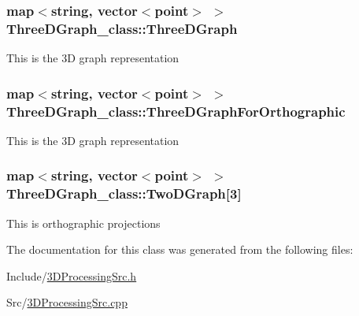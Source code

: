 \subsubsection[{\texorpdfstring{Three\+D\+Graph}{ThreeDGraph}}]{\setlength{\rightskip}{0pt plus 5cm}map$<$string, vector$<${\bf point}$>$ $>$ Three\+D\+Graph\+\_\+class\+::\+Three\+D\+Graph}\hypertarget{classThreeDGraph__class_a10f2244053d72def3eed9fb4101f0236}{}\label{classThreeDGraph__class_a10f2244053d72def3eed9fb4101f0236}
This is the 3D graph representation 
\subsubsection[{\texorpdfstring{Three\+D\+Graph\+For\+Orthographic}{ThreeDGraphForOrthographic}}]{\setlength{\rightskip}{0pt plus 5cm}map$<$string, vector$<${\bf point}$>$ $>$ Three\+D\+Graph\+\_\+class\+::\+Three\+D\+Graph\+For\+Orthographic}\hypertarget{classThreeDGraph__class_a8099559641e72dbbd7e29e97f32dc242}{}\label{classThreeDGraph__class_a8099559641e72dbbd7e29e97f32dc242}
This is the 3D graph representation 
\subsubsection[{\texorpdfstring{Two\+D\+Graph}{TwoDGraph}}]{\setlength{\rightskip}{0pt plus 5cm}map$<$string, vector$<${\bf point}$>$ $>$ Three\+D\+Graph\+\_\+class\+::\+Two\+D\+Graph\mbox{[}3\mbox{]}}\hypertarget{classThreeDGraph__class_a352d2c3b25256d8a071132dd87606f99}{}\label{classThreeDGraph__class_a352d2c3b25256d8a071132dd87606f99}
This is orthographic projections 

The documentation for this class was generated from the following files\+:\begin{DoxyCompactItemize}
\item 
Include/\hyperlink{3DProcessingSrc_8h}{3\+D\+Processing\+Src.\+h}\item 
Src/\hyperlink{3DProcessingSrc_8cpp}{3\+D\+Processing\+Src.\+cpp}\end{DoxyCompactItemize}
